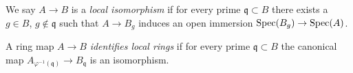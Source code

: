 


\begin{definition}
  \label{def:local-isomorphism}
  We say $A \to B$ is a \emph{local isomorphism} if for every prime $\mathfrak{q} \subset B$ there exists a $g \in B$, $g \notin \mathfrak{q}$ such that $A \to B_g$ induces an open immersion $\operatorname{Spec} (B_g) \to \operatorname{Spec} (A)$.
\end{definition}

\begin{definition}
  A ring map $A \to B$ \emph{identifies local rings} if for every prime $\mathfrak{q} \subset B$ the canonical map $A_{\varphi^{-1}(\mathfrak{q})} \to B_{\mathfrak{q}}$ is an isomorphism.
  \label{def:identify-local-rings}
\end{definition}

